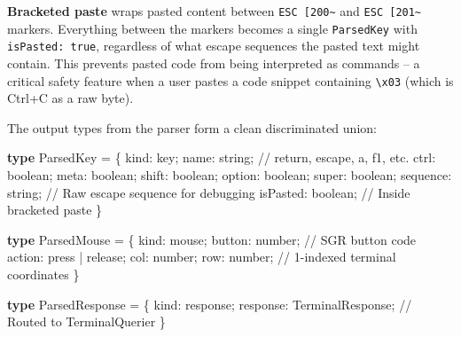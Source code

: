 \documentclass[
  english,
  11pt,
  letterpaper,
]{book}
\newenvironment{Shaded}{\begin{snugshade}}{\end{snugshade}}
\newcommand{\CommentTok}[1]{\textcolor[rgb]{0.37,0.37,0.37}{#1}}
\newcommand{\DataTypeTok}[1]{\textcolor[rgb]{0.68,0.00,0.00}{#1}}
\newcommand{\KeywordTok}[1]{\textcolor[rgb]{0.00,0.23,0.31}{\textbf{#1}}}
\newcommand{\NormalTok}[1]{\textcolor[rgb]{0.00,0.23,0.31}{#1}}
\newcommand{\OperatorTok}[1]{\textcolor[rgb]{0.37,0.37,0.37}{#1}}
\newcommand{\StringTok}[1]{\textcolor[rgb]{0.13,0.47,0.30}{#1}}
\begin{document}
\textbf{Bracketed paste} wraps pasted content between
\texttt{ESC\ {[}200\textasciitilde{}} and
\texttt{ESC\ {[}201\textasciitilde{}} markers. Everything between the
markers becomes a single \texttt{ParsedKey} with
\texttt{isPasted:\ true}, regardless of what escape sequences the pasted
text might contain. This prevents pasted code from being interpreted as
commands -- a critical safety feature when a user pastes a code snippet
containing \texttt{\textbackslash{}x03} (which is Ctrl+C as a raw byte).

The output types from the parser form a clean discriminated union:

\begin{Shaded}
\begin{Highlighting}[]
\KeywordTok{type}\NormalTok{ ParsedKey }\OperatorTok{=}\NormalTok{ \{}
\NormalTok{  kind}\OperatorTok{:} \StringTok{\textquotesingle{}key\textquotesingle{}}\OperatorTok{;}
\NormalTok{  name}\OperatorTok{:} \DataTypeTok{string}\OperatorTok{;}        \CommentTok{// \textquotesingle{}return\textquotesingle{}, \textquotesingle{}escape\textquotesingle{}, \textquotesingle{}a\textquotesingle{}, \textquotesingle{}f1\textquotesingle{}, etc.}
\NormalTok{  ctrl}\OperatorTok{:} \DataTypeTok{boolean}\OperatorTok{;}\NormalTok{ meta}\OperatorTok{:} \DataTypeTok{boolean}\OperatorTok{;}\NormalTok{ shift}\OperatorTok{:} \DataTypeTok{boolean}\OperatorTok{;}
\NormalTok{  option}\OperatorTok{:} \DataTypeTok{boolean}\OperatorTok{;}\NormalTok{ super}\OperatorTok{:} \DataTypeTok{boolean}\OperatorTok{;}
\NormalTok{  sequence}\OperatorTok{:} \DataTypeTok{string}\OperatorTok{;}    \CommentTok{// Raw escape sequence for debugging}
\NormalTok{  isPasted}\OperatorTok{:} \DataTypeTok{boolean}\OperatorTok{;}   \CommentTok{// Inside bracketed paste}
\NormalTok{\}}

\KeywordTok{type}\NormalTok{ ParsedMouse }\OperatorTok{=}\NormalTok{ \{}
\NormalTok{  kind}\OperatorTok{:} \StringTok{\textquotesingle{}mouse\textquotesingle{}}\OperatorTok{;}
\NormalTok{  button}\OperatorTok{:} \DataTypeTok{number}\OperatorTok{;}      \CommentTok{// SGR button code}
\NormalTok{  action}\OperatorTok{:} \StringTok{\textquotesingle{}press\textquotesingle{}} \OperatorTok{|} \StringTok{\textquotesingle{}release\textquotesingle{}}\OperatorTok{;}
\NormalTok{  col}\OperatorTok{:} \DataTypeTok{number}\OperatorTok{;}\NormalTok{ row}\OperatorTok{:} \DataTypeTok{number}\OperatorTok{;}  \CommentTok{// 1{-}indexed terminal coordinates}
\NormalTok{\}}

\KeywordTok{type}\NormalTok{ ParsedResponse }\OperatorTok{=}\NormalTok{ \{}
\NormalTok{  kind}\OperatorTok{:} \StringTok{\textquotesingle{}response\textquotesingle{}}\OperatorTok{;}
\NormalTok{  response}\OperatorTok{:}\NormalTok{ TerminalResponse}\OperatorTok{;}  \CommentTok{// Routed to TerminalQuerier}
\NormalTok{\}}
\end{Highlighting}
\end{Shaded}
\end{document}
